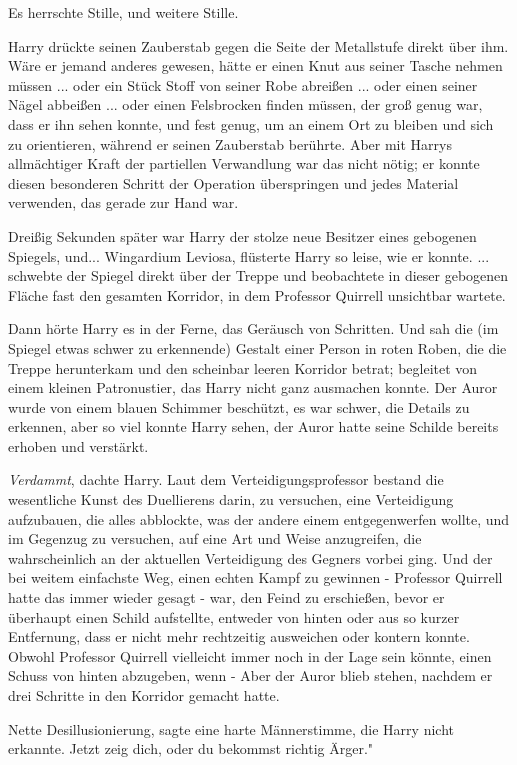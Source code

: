 Es herrschte Stille, und weitere Stille.

Harry drückte seinen Zauberstab gegen die Seite der Metallstufe direkt über ihm.
Wäre er jemand anderes gewesen, hätte er einen Knut aus seiner Tasche nehmen
müssen ... oder ein Stück Stoff von seiner Robe abreißen ... oder einen seiner
Nägel abbeißen ... oder einen Felsbrocken finden müssen, der groß genug war,
dass er ihn sehen konnte, und fest genug, um an einem Ort zu bleiben und sich zu
orientieren, während er seinen Zauberstab berührte. Aber mit Harrys allmächtiger
Kraft der partiellen Verwandlung war das nicht nötig; er konnte diesen
besonderen Schritt der Operation überspringen und jedes Material verwenden, das
gerade zur Hand war.

Dreißig Sekunden später war Harry der stolze neue Besitzer eines gebogenen
Spiegels, und... \glqq Wingardium Leviosa\grqq{}, flüsterte Harry so leise, wie
er konnte. ... schwebte der Spiegel direkt über der Treppe und beobachtete in
dieser gebogenen Fläche fast den gesamten Korridor, in dem Professor Quirrell
unsichtbar wartete.

Dann hörte Harry es in der Ferne, das Geräusch von Schritten. Und sah die (im
Spiegel etwas schwer zu erkennende) Gestalt einer Person in roten Roben, die die
Treppe herunterkam und den scheinbar leeren Korridor betrat; begleitet von einem
kleinen Patronustier, das Harry nicht ganz ausmachen konnte. Der Auror wurde von
einem blauen Schimmer beschützt, es war schwer, die Details zu erkennen, aber so
viel konnte Harry sehen, der Auror hatte seine Schilde bereits erhoben und
verstärkt.

\emph{Verdammt}, dachte Harry. Laut dem Verteidigungsprofessor bestand die
wesentliche Kunst des Duellierens darin, zu versuchen, eine Verteidigung
aufzubauen, die alles abblockte, was der andere einem entgegenwerfen wollte, und
im Gegenzug zu versuchen, auf eine Art und Weise anzugreifen, die wahrscheinlich
an der aktuellen Verteidigung des Gegners vorbei ging. Und der bei weitem
einfachste Weg, einen echten Kampf zu gewinnen - Professor Quirrell hatte das
immer wieder gesagt - war, den Feind zu erschießen, bevor er überhaupt einen
Schild aufstellte, entweder von hinten oder aus so kurzer Entfernung, dass er
nicht mehr rechtzeitig ausweichen oder kontern konnte. Obwohl Professor Quirrell
vielleicht immer noch in der Lage sein könnte, einen Schuss von hinten
abzugeben, wenn - Aber der Auror blieb stehen, nachdem er drei Schritte in den
Korridor gemacht hatte.

\glqq Nette Desillusionierung\grqq{}, sagte eine harte Männerstimme, die Harry
nicht erkannte. \glqq Jetzt zeig dich, oder du bekommst richtig Ärger."


